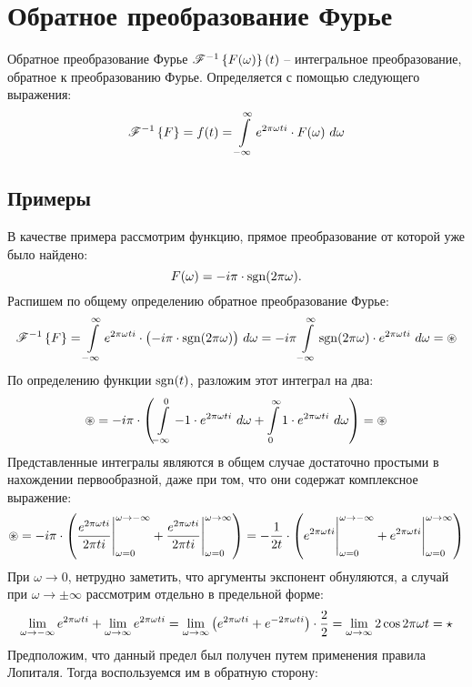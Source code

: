 \section{Обратное преобразование Фурье}

	Обратное преобразование Фурье $\mathscr{F}^{-1} \left\lbrace {F(\omega)} \right\rbrace \left( t \right)$ -- интегральное преобразование, обратное к преобразованию Фурье. Определяется с помощью следующего выражения:
	\[ \mathscr{F}^{-1} \left\lbrace {F} \right\rbrace = f(t) = \int\limits_{-\infty}^{\infty} e^{2 \pi \omega t i} \cdot F(\omega) ~ d \omega \]

	\subsection{Примеры}

		В качестве примера рассмотрим функцию, прямое преобразование от которой уже было найдено:
		\[ F(\omega) = - i \pi \cdot \operatorname{sgn}(2 \pi \omega). \] 
		Распишем по общему определению обратное преобразование Фурье:
		\[ 
			\mathscr{F}^{-1} \left\lbrace {F} \right\rbrace 
				= \int\limits_{-\infty}^{\infty} e^{2 \pi \omega t i} \cdot \bigl( - i \pi \cdot \operatorname{sgn}(2 \pi \omega) \bigr) ~ d \omega 
				= -i \pi \int\limits_{-\infty}^{\infty} \operatorname{sgn}(2 \pi \omega) \cdot e^{2 \pi \omega t i} ~ d \omega 
				= \circledast 
		\]
		По определению функции $\operatorname{sgn}(t)$, разложим этот интеграл на два:
		\[ 
			\circledast 
				= -i \pi \cdot \left(  \int\limits_{-\infty}^{0} -1 \cdot e^{2 \pi \omega t i} ~ d \omega 
				+ \int\limits_{0}^{\infty} 1 \cdot e^{2 \pi \omega t i} ~ d \omega  \right) 
				= \circledast 
		\]
		Представленные интегралы являются в общем случае достаточно простыми в нахождении первообразной, даже при том, что они содержат комплексное выражение:
		\[ 
			\circledast 
				= -i \pi \cdot \left(  
					\frac{e^{2 \pi \omega t i}}{2 \pi t i} \Biggl\vert \Biggr._{\omega = 0}^{\omega \to -\infty} 
					+ \frac{e^{2 \pi \omega t i}}{2 \pi t i} \Biggl\vert \Biggr._{\omega = 0}^{\omega \to \infty} 
				 \right) 
				= -\frac{1}{2t} \cdot \left(  
					e^{2 \pi \omega t i} \Biggl\vert \Biggr._{\omega = 0}^{\omega \to -\infty} 
					+ e^{2 \pi \omega t i} \Biggl\vert \Biggr._{\omega = 0}^{\omega \to \infty} 
				 \right) 
		\]
		При $\omega \to 0$, нетрудно заметить, что аргументы экспонент обнуляются, а случай при $\omega \to \pm \infty$ рассмотрим отдельно в предельной форме:
		\[ 
			\lim_{\omega \to -\infty} e^{2 \pi \omega t i} + \lim_{\omega \to \infty} e^{2 \pi \omega t i} 
				= \lim_{\omega \to \infty} \left(  e^{2 \pi \omega t i} + e^{-2 \pi \omega t i}  \right) \cdot \frac{2}{2} 
				= \lim_{\omega \to \infty} 2 \cos{2 \pi \omega t} 
				= \star 
		\]
		Предположим, что данный предел был получен путем применения правила Лопиталя. Тогда воспользуемся им в обратную сторону:
